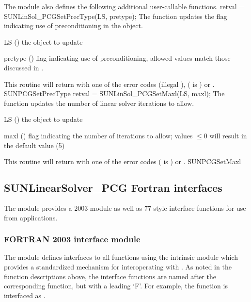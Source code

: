 The {\sunlinsolpcg} module also defines the following additional
user-callable functions.
%
%
{
  retval = SUNLinSol\_PCGSetPrecType(LS, pretype);
}
{
  The function  updates the flag
  indicating use of preconditioning in the {\sunlinsolpcg} object.
}
{
  \begin{args}[pretype]
  \item[LS] ()
    the {\sunlinsolpcg} object to update
  \item[pretype] ()
    flag indicating use of preconditioning, allowed
    values match those discussed in .
  \end{args}
}
{
  This routine will return with one of the error codes
   (illegal ), 
  ( is ) or .
}
{}
{SUNPCGSetPrecType}
%
%
{
  retval = SUNLinSol\_PCGSetMaxl(LS, maxl);
}
{
  The function  updates the number of
  linear solver iterations to allow.
}
{
  \begin{args}[maxl]
  \item[LS] ()
    the {\sunlinsolpcg} object to update
  \item[maxl] ()
    flag indicating the number of iterations to allow; values $\le0$
    will result in the default value (5)
  \end{args}
}
{
  This routine will return with one of the error codes
   ( is ) or .
}
{}
{SUNPCGSetMaxl}


\subsection{SUNLinearSolver\_PCG Fortran interfaces}
\label{ss:sunlinsol_pcg_fortran}

The {\sunlinsolpcg} module provides a {\F} 2003 module as well as {\F} 77
style interface functions for use from {\F} applications.

\subsubsection*{FORTRAN 2003 interface module}
The  {\F} module defines interfaces to all
{\sunlinsolpcg} {\CC} functions using the intrinsic 
module which provides a standardized mechanism for interoperating with {\CC}. As
noted in the {\CC} function descriptions above, the interface functions are
named after the corresponding {\CC} function, but with a leading `F'. For
example, the function  is interfaced as
.

